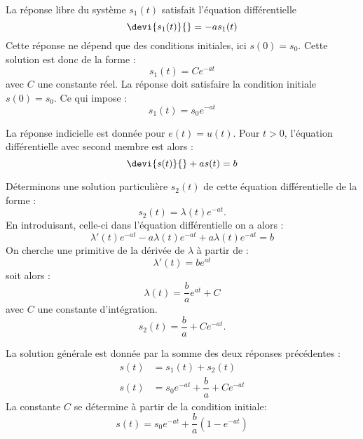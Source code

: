 La réponse libre du système $s_1(t)$ satisfait l'équation différentielle
$$
\devi{s_1(t)}{}=-as_1(t)
$$
Cette réponse ne dépend que des conditions initiales, ici $s(0)=s_0$.
Cette solution est donc de la forme :
$$
s_1(t)=Ce^{-at}
$$
avec $C$ une constante réel. La réponse doit satisfaire la condition initiale $s(0)=s_0$.
Ce qui impose :
$$
s_1(t)=s_0e^{-at}
$$
                                                                                                                                          
La réponse indicielle est donnée pour $e(t)=u(t)$. Pour $t>0$, l'équation différentielle
avec second membre est alors :
$$
\devi{s(t)}{}+as(t)=b
$$
                                                                                                                                          
Déterminons une solution particulière $s_2(t)$ de cette
équation différentielle de la forme :
$$
s_2(t)=\lambda(t)e^{-at}.
$$
En introduisant, celle-ci dans l'équation différentielle on a alors :
$$
\lambda'(t)e^{-at}-a\lambda(t)e^{-at}+a\lambda(t)e^{-at}=b
$$
On cherche une primitive de la dérivée de $\lambda$ à partir de :
$$
\lambda'(t)=be^{at}
$$
soit alors :
$$
\lambda(t)=\dfrac{b}{a}e^{at}+C
$$
avec $C$ une constante d'intégration.
$$
s_2(t)=\dfrac{b}{a}+Ce^{-at}.
$$
                                                                                                                                          
La solution générale est donnée par la somme des deux réponses précédentes :
\begin{align*}
    s(t)&=s_1(t)+s_2(t)\\
    s(t)&=s_0e^{-at}+\dfrac{b}{a}+Ce^{-at}
\end{align*}
La constante $C$ se détermine à partir de la condition initiale:
$$
s(t)=s_0e^{-at}+\dfrac{b}{a}\left(1-e^{-at}\right)
$$
\begin{center}
\end{center}

